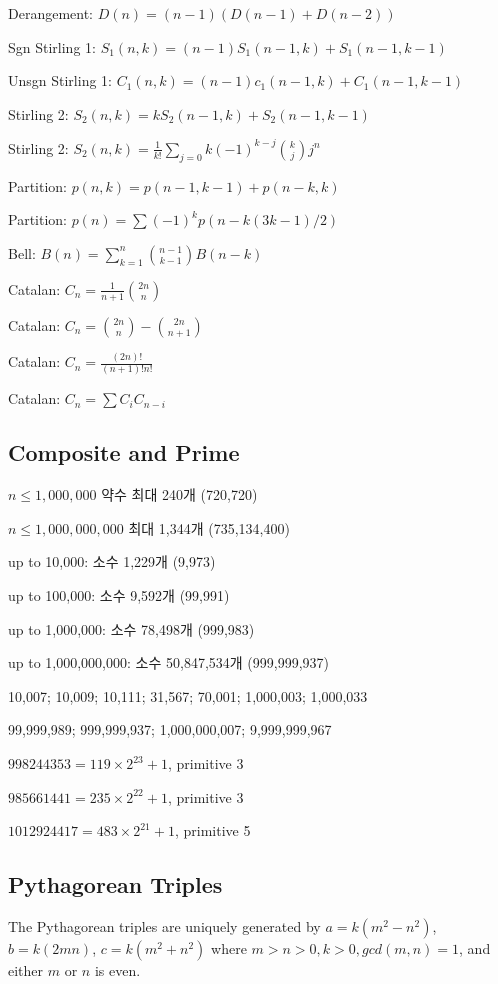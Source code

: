 Derangement: $D(n) = (n-1)(D(n-1)+D(n-2))$

Sgn Stirling 1: $S_1(n,k) = (n-1)S_1(n-1,k) + S_1(n-1,k-1)$

Unsgn Stirling 1: $C_1(n,k) = (n-1)c_1(n-1,k) + C_1(n-1,k-1)$

Stirling 2: $S_2(n,k) = kS_2(n-1,k) + S_2(n-1,k-1)$

Stirling 2: $S_2(n,k) = \frac{1}{k!} \sum_{j=0}{k} (-1)^{k-j} \binom{k}{j} j^n$

Partition: $p(n,k) = p(n-1,k-1) + p(n-k,k)$

Partition: $p(n) = \sum (-1)^k p(n-k(3k-1)/2)$

Bell: $B(n) = \sum_{k=1}^{n} \binom{n-1}{k-1}B(n-k)$

Catalan: $C_n = \frac{1}{n+1}\binom{2n}{n}$

Catalan: $C_n = \binom{2n}{n} - \binom{2n}{n+1}$

Catalan: $C_n = \frac{(2n)!}{(n+1)!n!}$

Catalan: $C_n = \sum C_i C_{n-i}$

\subsection{Composite and Prime}
$n \leq 1,000,000$ 약수 최대 240개 (720,720)

$n \leq 1,000,000,000$ 최대 1,344개 (735,134,400)

up to 10,000: 소수 1,229개 (9,973)

up to 100,000: 소수 9,592개 (99,991)

up to 1,000,000: 소수 78,498개 (999,983)

up to 1,000,000,000: 소수 50,847,534개 (999,999,937)

10,007; 10,009; 10,111; 31,567; 70,001; 1,000,003; 1,000,033

99,999,989; 999,999,937; 1,000,000,007; 9,999,999,967

$998244353 = 119 \times 2^{23} + 1$, primitive 3

$985661441 = 235 \times 2^{22} + 1$, primitive 3

$1012924417 = 483 \times 2^{21} + 1$, primitive 5

\subsection{Pythagorean Triples}
The Pythagorean triples are uniquely generated by $a=k(m^2-n^2)$, $b=k(2mn)$, $c=k(m^2+n^2)$ where $m>n>0, k>0, gcd(m,n)=1$, and either $m$ or $n$ is even.